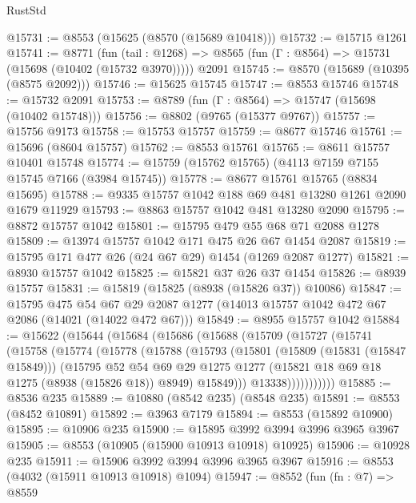 \begin{lexlean}{RustStd}
\begin{coremodule}
@15731 := @8553 (@15625 (@8570 (@15689 @10418)))
@15732 := @15715 @1261
@15741 := @8771
    (fun (tail : @1268) => @8565 (fun (Γ : @8564) => @15731 (@15698 (@10402 (@15732 @3970)))))
    @2091
@15745 := @8570 (@15689 (@10395 (@8575 @2092)))
@15746 := @15625 @15745
@15747 := @8553 @15746
@15748 := @15732 @2091
@15753 := @8789 (fun (Γ : @8564) => @15747 (@15698 (@10402 @15748)))
@15756 := @8802 (@9765 (@15377 @9767))
@15757 := @15756 @9173
@15758 := @15753 @15757
@15759 := @8677 @15746
@15761 := @15696 (@8604 @15757)
@15762 := @8553 @15761
@15765 := @8611 @15757 @10401 @15748
@15774 := @15759 (@15762 @15765) (@4113 @7159 @7155 @15745 @7166 (@3984 @15745))
@15778 := @8677 @15761 @15765 (@8834 @15695)
@15788 := @9335 @15757 @1042 @188 @69 @481 @13280 @1261 @2090 @1679 @11929
@15793 := @8863 @15757 @1042 @481 @13280 @2090
@15795 := @8872 @15757 @1042
@15801 := @15795 @479 @55 @68 @71 @2088 @1278
@15809 := @13974 @15757 @1042 @171 @475 @26 @67 @1454 @2087
@15819 := @15795 @171 @477 @26 (@24 @67 @29) @1454 (@1269 @2087 @1277)
@15821 := @8930 @15757 @1042
@15825 := @15821 @37 @26 @37 @1454
@15826 := @8939 @15757
@15831 := @15819 (@15825 (@8938 (@15826 @37)) @10086)
@15847 := @15795
    @475
    @54
    @67
    @29
    @2087
    @1277
    (@14013 @15757 @1042 @472 @67 @2086 (@14021 (@14022 @472 @67)))
@15849 := @8955 @15757 @1042
@15884 := @15622
    (@15644
      (@15684
        (@15686
          (@15688
            (@15709
              (@15727
                (@15741
                  (@15758
                    (@15774
                      (@15778
                        (@15788
                          (@15793
                            (@15801
                              (@15809 (@15831 (@15847 @15849)))
                              (@15795
                                @52
                                @54
                                @69
                                @29
                                @1275
                                @1277
                                (@15821 @18 @69 @18 @1275 (@8938 (@15826 @18)) @8949)
                                @15849)))
                          @13338)))))))))))
@15885 := @8536 @235
@15889 := @10880 (@8542 @235) (@8548 @235)
@15891 := @8553 (@8452 @10891)
@15892 := @3963 @7179
@15894 := @8553 (@15892 @10900)
@15895 := @10906 @235
@15900 := @15895 @3992 @3994 @3996 @3965 @3967
@15905 := @8553 (@10905 (@15900 @10913 @10918) @10925)
@15906 := @10928 @235
@15911 := @15906 @3992 @3994 @3996 @3965 @3967
@15916 := @8553 (@4032 (@15911 @10913 @10918) @1094)
@15947 := @8552
    (fun (fn : @7) =>
    @8559

\end{coremodule}
\end{lexlean}
